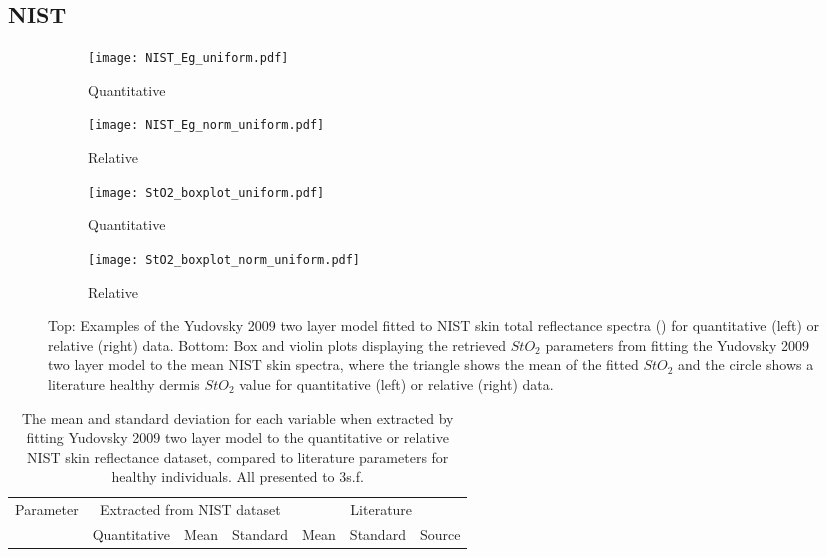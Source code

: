 \begin{subappendices}
\subsection{NIST}
\begin{figure}[h]
    \centering
    \begin{subfigure}{0.49\textwidth}
        \texttt{[image: NIST\_Eg\_uniform.pdf]}
        \caption{Quantitative}
        \label{fig:egspectraNISTu}
    \end{subfigure}
    \begin{subfigure}{0.49\textwidth}
        \texttt{[image: NIST\_Eg\_norm\_uniform.pdf]}
        \caption{Relative}
        \label{fig:egspectraNISTnormu}
    \end{subfigure}
    \begin{subfigure}{0.49\textwidth}
        \texttt{[image: StO2\_boxplot\_uniform.pdf]}
        \caption{Quantitative}
        \label{fig:egparamStO2NISTu}
    \end{subfigure}
    \begin{subfigure}{0.49\textwidth}
        \texttt{[image: StO2\_boxplot\_norm\_uniform.pdf]}
        \caption{Relative}
        \label{fig:egparamStO2NISTnormu}
    \end{subfigure}
    \caption{Top: Examples of the Yudovsky 2009 two layer model fitted to NIST skin total reflectance spectra () for quantitative (left) or relative (right) data. Bottom: Box and violin plots displaying the retrieved $StO_2$ parameters from fitting the Yudovsky 2009 two layer model to the mean NIST skin spectra, where the triangle shows the mean of the fitted $StO_2$ and the circle shows a literature healthy dermis $StO_2$ value \cite{VanManen2021} for quantitative (left) or relative (right) data.}
    \label{fig:NISTuniform}
\end{figure}
\begin{table}[h]
    \centering
    \caption{The mean and standard deviation for each variable when extracted by fitting Yudovsky 2009 two layer model to the quantitative or relative NIST skin reflectance dataset, compared to literature parameters for healthy individuals. All presented to 3s.f.}
    \begin{tabular}{|c|ccc|ccc|}
        \hline
        \multirow{2}{*}{Parameter} & \multicolumn{3}{c}{Extracted from NIST dataset} & \multicolumn{3}{|c|}{Literature} \\
        \cline{2-7}
         & Quantitative & \multirow{2}{*}{Mean} & Standard & \multirow{2}{*}{Mean} & Standard & \multirow{2}{*}{Source} \\

\end{tabular}
\end{table}
\end{subappendices}
